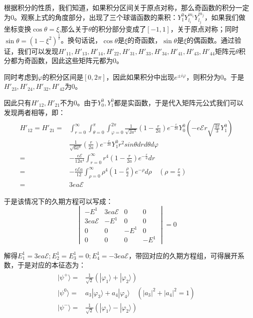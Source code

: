 根据积分的性质，我们知道，如果积分区间关于原点对称，那么奇函数的积分一定为0。观察上式的角度部分，出现了三个球谐函数的乘积：$Y_1^0Y_{l_i}^{m_i}Y_{l_j}^{m_j}$，如果我们做坐标变换$\cos\theta=\xi$,那么关于$\theta$的积分部分变成了$[-1,1]$，关于原点对称；同时$\sin\theta=(1-\xi^2)^{\frac{1}{2}}$。换句话说，$\cos\theta$是$\xi$的奇函数，$\sin\theta$是$\xi$的偶函数。通过验证，我们可以发现$H'_{11},H'_{13},H'_{14},H'_{22},H'_{31},H'_{33},H'_{34},H'_{41},H'_{43},H'_{44}$矩阵元$\theta$积分都为奇函数，因此这些矩阵元都为0。

同时考虑到$\varphi$的积分区间是$[0,2\pi]$，因此如果积分中出现$e^{\pm i \varphi }$，则积分为0。于是$H'_{23},H'_{24},H'_{32},H'_{42}$为0。

因此只有$H'_{12},H'_{21}$不为0。由于$Y_0^0,Y_1^0$都是实函数，于是代入矩阵元公式我们可以发现两者相等，即：
\begin{align}
\begin{split}
     H'_{12}=H'_{21}=&\int_{r=0}^{\infty} \int_{\theta=0}^{\pi}\int_{\varphi=0}^{2\pi} \frac{1}{\sqrt{2a^3}}(1-\frac{r}{2a})e^{-\frac{r}{2a}}Y_0^0(-e\mathscr{E}r\sqrt{\frac{4\pi}{3}}Y_1^0)\\
    &\frac{1}{\sqrt{6a^3}}(\frac{r}{2a})e^{-\frac{r}{2a}}Y_1^0 r^2sin\theta dr d\theta d\varphi\\
    =& -\frac{e\mathscr{E}}{12a^4}\int_{r=0}^{\infty}r^4(1-\frac{r}{2a})e^{-\frac{r}{a}}dr\\
   =&-\frac{e\mathscr{E}a}{12}\int_{\rho=0}^{\infty}\rho^4(1-\frac{\rho}{2})e^{-\rho}d\rho \quad(\rho=\frac{r}{a})\\
   =&3ea\mathscr{E}
\end{split}
\end{align}

于是该情况下的久期方程可以写成：
\begin{equation}
    \begin{vmatrix}
    -E^{1} & 3ea\mathscr{E} & 0 & 0\\
    3ea\mathscr{E} & -E^{1} & 0 & 0\\
    0 & 0 & -E^{1} & 0\\
    0 & 0 & 0 & -E^{1}
    \end{vmatrix}=0
\end{equation}

解得$E_1^{1}=3ea\mathscr{E};E_2^{1}=E_3^{1}=0;E_4^{1}=-3ea\mathscr{E}$，带回对应的久期方程组，可得展开系数，于是对应的本征态为：
\begin{align}
    \begin{split}
        |\psi^{+}\rangle=&\frac{1}{\sqrt{2}}(|\varphi_1\rangle+|\varphi_2\rangle)\\
        |\psi^{0}\rangle=& a_3|\varphi_3\rangle + a_4|\varphi_4\rangle \quad(|a_3|^2+|a_4|^2=1)\\
        |\psi^{-}\rangle=& \frac{1}{\sqrt{2}}(|\varphi_1\rangle-|\varphi_2\rangle)
    \end{split}
\end{align}

